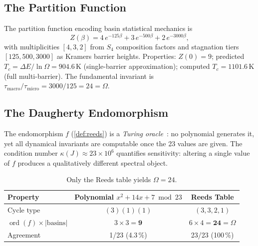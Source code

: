 \documentclass[11pt,a4paper]{article}
\theoremstyle{plain}
\theoremstyle{remark}
\renewcommand{\Omega}{\varOmega}
\newcommand{\ord}{\operatorname{ord}}
\begin{document}
\subsection{The Partition Function}
\label{sec:partition}

The partition function encoding basin statistical mechanics is
\begin{equation}\label{eq:partition}
  Z(\beta) = 4\,e^{-125\beta} + 3\,e^{-500\beta} + 2\,e^{-3000\beta},
\end{equation}
with multiplicities $[4,3,2]$ from $S_4$ composition factors and stagnation
tiers $[125,500,3000]$ as Kramers barrier heights.  Properties:
$Z(0)=9$; predicted $T_c = \Delta E/\ln\Omega = 904.6$\,K (single-barrier
approximation); computed $T_c = 1101.6$\,K (full multi-barrier).  The
fundamental invariant is
$\tau_{\mathrm{macro}}/\tau_{\mathrm{micro}}=3000/125=24=\Omega$.

\subsection{The Daugherty Endomorphism}
\label{sec:soyga}

The endomorphism $f$ (\cref{def:reeds}) is a \emph{Turing
oracle}~\cite{turing1939}: no polynomial generates it, yet all dynamical
invariants are computable once the 23 values are given.  The condition
number $\kappa(J)\approx 23\times 10^6$ quantifies sensitivity: altering
a single value of $f$ produces a qualitatively different spectral object.

\begin{table}[H]
\centering\small
\begin{tabular}{@{}lcc@{}}
\toprule
Property & Polynomial $x^2\!+14x+7\bmod 23$ & Reeds Table\\
\midrule
Cycle type         & $(3)(1)(1)$              & $(3,3,2,1)$\\
$\ord(f)\times|\mathrm{basins}|$
                   & $3\times 3=\mathbf{9}$   & $6\times 4=\mathbf{24}=\Omega$\\
Agreement          & 1/23 (4.3\,\%)           & 23/23 (100\,\%)\\
\bottomrule
\end{tabular}
\caption{Only the Reeds table yields $\Omega=24$.}
\label{tab:comparison}
\end{table}
\end{document}
